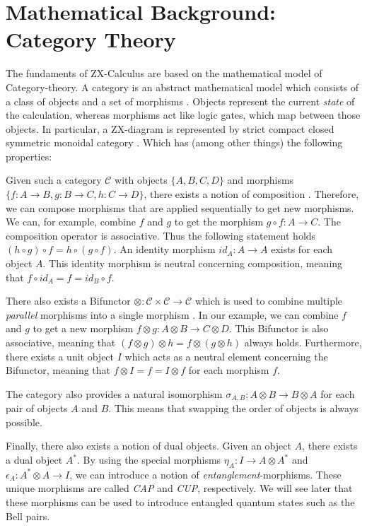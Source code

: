 \section{Mathematical Background: Category Theory}

The fundaments of ZX-Calculus are based on the mathematical model of Category-theory. A category is an abstract mathematical model which consists of a class of objects and a set of morphisms \cite{quanlong2023completness}. Objects represent the current \textit{state} of the calculation, whereas morphisms act like logic gates, which map between those objects. In particular, a ZX-diagram is represented by strict compact closed symmetric monoidal category \cite{emmanueljeandel2020zx}. Which has (among other things) the following properties:

Given such a category $\mathcal{C}$ with objects $\{A, B, C, D\}$ and morphisms $\{f: A \rightarrow B, g: B \rightarrow C, h: C \rightarrow D\}$, there exists a notion of composition \label{sequential-composition}. Therefore, we can compose morphisms that are applied sequentially to get new morphisms. We can, for example, combine $f$ and $g$ to get the morphism $g \circ f: A \rightarrow C$. The composition operator is associative. Thus the following statement holds $(h \circ g) \circ f = h \circ (g \circ f)$. An identity morphism $id_A: A \rightarrow A$ exists for each object $A$. This identity morphism is neutral concerning composition, meaning that $f \circ id_A = f = id_B \circ f$.

There also exists a Bifunctor $\otimes:\mathcal{C}\times\mathcal{C}\rightarrow\mathcal{C}$ which is used to combine multiple \textit{parallel} morphisms into a single morphism \label{parallel-composition}. In our example, we can combine $f$ and $g$ to get a new morphism $f \otimes g: A \otimes B \rightarrow C \otimes D$. This Bifunctor is also associative, meaning that $(f \otimes g) \otimes h = f \otimes (g \otimes h)$ always holds. Furthermore, there exists a unit object $I$ which acts as a neutral element concerning the Bifunctor, meaning that $f \otimes I = f = I \otimes f$ for each morphism $f$.

The category also provides a natural isomorphism $\sigma_{A, B}: A \otimes B \rightarrow B \otimes A$ for each pair of objects $A$ and $B$. This means that swapping the order of objects is always possible.

Finally, there also exists a notion of dual objects. Given an object $A$, there exists a dual object $A^*$. By using the special morphisms $\eta_A: I \rightarrow A \otimes A^*$ and $\epsilon_A: A^* \otimes A \rightarrow I$, we can introduce a notion of \textit{entanglement}-morphisms. These unique morphisms are called \textit{CAP} and \textit{CUP}, respectively. We will see later that these morphisms can be used to introduce entangled quantum states such as the Bell pairs.

